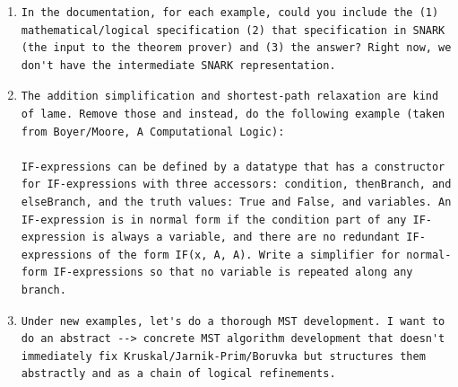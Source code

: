 \documentclass[runningheads]{llncs}
\begin{document}
\begin{enumerate}
\begin{lstlisting}
Now, add a new file with "new" synthesis examples (since the ones we've done are all prior Manna/Waldinger examples). What are non-trivial examples that can really exercise this paradigm?
\end{lstlisting}
\item
\begin{lstlisting}
In the documentation, for each example, could you include the (1) mathematical/logical specification (2) that specification in SNARK (the input to the theorem prover) and (3) the answer? Right now, we don't have the intermediate SNARK representation.
\end{lstlisting}
\item
\begin{lstlisting}
The addition simplification and shortest-path relaxation are kind of lame. Remove those and instead, do the following example (taken from Boyer/Moore, A Computational Logic):

IF-expressions can be defined by a datatype that has a constructor for IF-expressions with three accessors: condition, thenBranch, and elseBranch, and the truth values: True and False, and variables. An IF-expression is in normal form if the condition part of any IF-expression is always a variable, and there are no redundant IF-expressions of the form IF(x, A, A). Write a simplifier for normal-form IF-expressions so that no variable is repeated along any branch.
\end{lstlisting}
\item
\begin{lstlisting}
Under new examples, let's do a thorough MST development. I want to do an abstract --> concrete MST algorithm development that doesn't immediately fix Kruskal/Jarnik-Prim/Boruvka but structures them abstractly and as a chain of logical refinements.


\end{lstlisting}
\end{enumerate}
\end{document}
